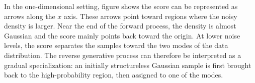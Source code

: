 \documentclass[11pt,a4paper]{article}
\begin{document}
In the one-dimensional setting, figure shows the score can be represented as arrows along
the $x$ axis. These arrows point toward regions where the noisy density is
larger. Near the end of the forward process, the density is almost Gaussian and
the score mainly points back toward the origin. At lower noise levels, the
score separates the samples toward the two modes of the data distribution. The
reverse generative process can therefore be interpreted as a gradual
specialization: an initially structureless Gaussian sample is first brought
back to the high-probability region, then assigned to one of the modes.
\end{document}
